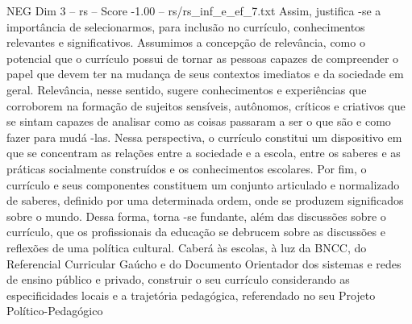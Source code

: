 \begin{textsample}{NEG Dim 3 – rs – Score -1.00 – rs/rs\_inf\_e\_ef\_7.txt}
Assim, justifica -se a importância de selecionarmos, para inclusão no currículo, conhecimentos relevantes e significativos.
Assumimos a concepção de relevância, como o potencial que o currículo possui de tornar as pessoas capazes de compreender o papel que devem ter na mudança de seus contextos imediatos e da sociedade em geral.
Relevância, nesse sentido, sugere conhecimentos e experiências que corroborem na formação de sujeitos sensíveis, autônomos, críticos e criativos que se sintam capazes de analisar como as coisas passaram a ser o que são e como fazer para mudá -las.
Nessa perspectiva, o currículo constitui um dispositivo em que se concentram as relações entre a sociedade e a escola, entre os saberes e as práticas socialmente construídos e os conhecimentos escolares.
Por fim, o currículo e seus componentes constituem um conjunto articulado e normalizado de saberes, definido por uma determinada ordem, onde se produzem significados sobre o mundo.
Dessa forma, torna -se fundante, além das discussões sobre o currículo, que os profissionais da educação se debrucem sobre as discussões e reflexões de uma política cultural.
Caberá às escolas, à luz da BNCC, do Referencial Curricular Gaúcho e do Documento Orientador dos sistemas e redes de ensino público e privado, construir o seu currículo considerando as especificidades locais e a trajetória pedagógica, referendado no seu Projeto Político-Pedagógico

\end{textsample}
